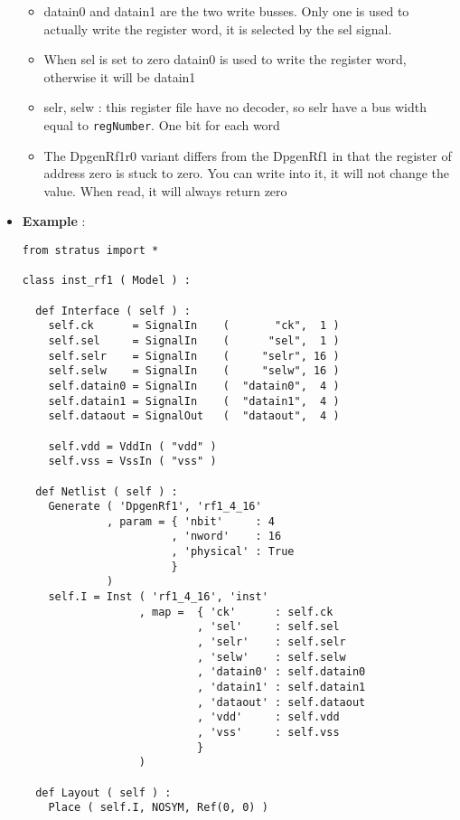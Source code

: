 \begin{itemize}
    \begin{itemize}
        \item datain0 and datain1 are the two write busses. Only one is used to actually write the register word, it is selected by the sel signal.
        \item When sel is set to zero datain0 is used to write the register word, otherwise it will be datain1
        \item selr, selw : this register file have no decoder, so selr have a bus width equal to \verb-regNumber-. One bit for each word
        \item The DpgenRf1r0 variant differs from the DpgenRf1 in that the register of address zero is stuck to zero. You can write into it, it will not change the value. When read, it will always return zero
    \end{itemize}    
    \item \textbf{Example} :
\begin{verbatim}
from stratus import *

class inst_rf1 ( Model ) :

  def Interface ( self ) :
    self.ck      = SignalIn    (       "ck",  1 )
    self.sel     = SignalIn    (      "sel",  1 )
    self.selr    = SignalIn    (     "selr", 16 )
    self.selw    = SignalIn    (     "selw", 16 ) 
    self.datain0 = SignalIn    (  "datain0",  4 )
    self.datain1 = SignalIn    (  "datain1",  4 )
    self.dataout = SignalOut   (  "dataout",  4 ) 
    
    self.vdd = VddIn ( "vdd" )
    self.vss = VssIn ( "vss" )
    
  def Netlist ( self ) :
    Generate ( 'DpgenRf1', 'rf1_4_16'
             , param = { 'nbit'     : 4
                       , 'nword'    : 16
                       , 'physical' : True
                       }
             )
    self.I = Inst ( 'rf1_4_16', 'inst'
                  , map =  { 'ck'      : self.ck
                           , 'sel'     : self.sel
                           , 'selr'    : self.selr
                           , 'selw'    : self.selw
                           , 'datain0' : self.datain0
                           , 'datain1' : self.datain1
                           , 'dataout' : self.dataout
                           , 'vdd'     : self.vdd
                           , 'vss'     : self.vss
                           }
                  )
    
  def Layout ( self ) :
    Place ( self.I, NOSYM, Ref(0, 0) )
\end{verbatim}
\end{itemize}
